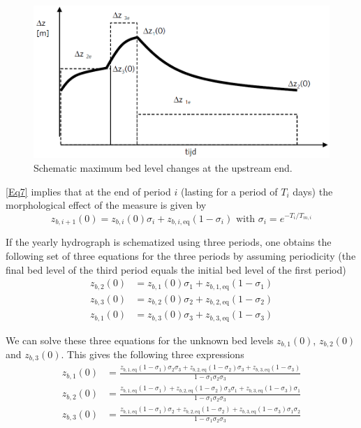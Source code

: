 \begin{figure}
\includegraphics[width=\columnwidth]{figures/Fig5.png}
\caption{Schematic maximum bed level changes at the upstream end.}
\label{App.Fig5}
\end{figure}

\autoref{Eq7} implies that at the end of period $i$ (lasting for a period of $T_i$ days) the morphological effect of the measure is given by
%
\begin{equation}
z_{b,i+1}(0) = z_{b,i} (0) \sigma_i + z_{b,i,\text{eq}} (1-\sigma_i) \text{ with } \sigma_i = e^{-T_i/T_{m,i}}
\label{Eq8a}
\end{equation}

If the yearly hydrograph is schematized using three periods, one obtains the following set of three equations for the three periods by assuming periodicity (the final bed level of the third period equals the initial bed level of the first period)
%
\begin{align}
z_{b,2}(0) &= z_{b,1}(0) \sigma_1 + z_{b,1,\text{eq}} (1-\sigma_1) \label{Eq8b} \\
z_{b,3}(0) &= z_{b,2}(0) \sigma_2 + z_{b,2,\text{eq}} (1-\sigma_2) \label{Eq8c} \\
z_{b,1}(0) &= z_{b,3}(0) \sigma_3 + z_{b,3,\text{eq}} (1-\sigma_3) \label{Eq8d}
\end{align}

We can solve these three equations for the unknown bed levels $z_{b,1}(0)$, $z_{b,2}(0)$ and $z_{b,3}(0)$.
This gives the following three expressions
%
\begin{align}
z_{b,1}(0) &= \frac{z_{b,1,\text{eq}} (1-\sigma_1) \sigma_2 \sigma_3 + z_{b,2,\text{eq}} (1-\sigma_2) \sigma_3 + z_{b,3,\text{eq}} (1-\sigma_3)}{1 - \sigma_1 \sigma_2 \sigma_3} \label{Eq8e} \\
z_{b,2}(0) &= \frac{z_{b,1,\text{eq}} (1-\sigma_1) + z_{b,2,\text{eq}} (1-\sigma_2) \sigma_3 \sigma_1 + z_{b,3,\text{eq}} (1-\sigma_3) \sigma_1}{1 - \sigma_1 \sigma_2 \sigma_3} \label{Eq8f} \\
z_{b,3}(0) &= \frac{z_{b,1,\text{eq}} (1-\sigma_1) \sigma_2 + z_{b,2,\text{eq}} (1-\sigma_2) + z_{b,3,\text{eq}} (1-\sigma_3) \sigma_1 \sigma_2}{1 - \sigma_1 \sigma_2 \sigma_3} \label{Eq8g}
\end{align}

